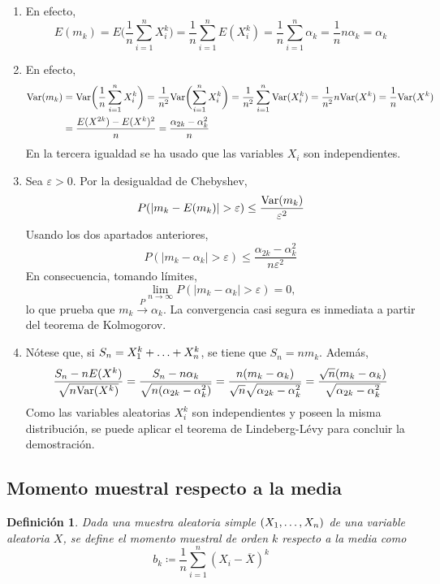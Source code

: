\documentclass[11pt]{report}
\makeatletter
\renewenvironment{proof}[1][\proofname]{\par
  \pushQED{\qed}%
  \normalfont \topsep\z@skip %
  \trivlist
  \item[\hskip\labelsep
        \itshape
    #1\@addpunct{.}]\ignorespaces
}{%
  \popQED\endtrivlist\@endpefalse
}
\newtheorem{definition}{Definición}
\theoremstyle{definition}
\makeatother
\begin{document}
\begin{proof}
\hfill
\begin{enumerate}
    \item En efecto,
    \[E(m_k) = E\biggl(\frac{1}{n}\sum_{i=1}^n X_i^k\biggr) = \frac{1}{n}\sum_{i=1}^n E(X_i^k) = \frac{1}{n}\sum_{i=1}^n \alpha_k = \frac{1}{n}n\alpha_k = \alpha_k\]
    \item En efecto,
    \[
    \begin{aligned}[t]
        \textup{Var}(m_k) &= \textup{Var}\biggl(\frac{1}{n}\sum_{i=1}^n X_i^k \biggr) = \frac{1}{n ^2} \textup{Var}\biggl(\sum_{i=1}^nX_i^k\biggr) = \frac{1}{n^2}\sum_{i=1}^n \textup{Var}(X_i^k)= \frac{1}{n^2}n \textup{Var}(X^k) = \frac{1}{n}\textup{Var}(X^k) \\
        &= \frac{E(X^{2k})-E(X^k)^2}{n} = \frac{\alpha_{2k}-\alpha_k^2}{n}
    \end{aligned}
    \]
    En la tercera igualdad se ha usado que las variables $X_i$ son independientes.
    \item Sea $\varepsilon>0$. Por la desigualdad de Chebyshev,
    \[P(|m_k-E(m_k)|>\varepsilon) \leq \frac{\textup{Var}(m_k)}{\varepsilon^2}\]
    Usando los dos apartados anteriores,
    \[P(|m_k-\alpha_k| > \varepsilon) \leq \frac{\alpha_{2k}-\alpha_k^2}{n\varepsilon^2}\]
    En consecuencia, tomando límites,
    \[\lim_{n \to \infty} P(|m_k-\alpha_k|> \varepsilon) = 0,\]
    lo que prueba que $m_k \xrightarrow{P} \alpha_k$. La convergencia casi segura es inmediata a partir del teorema de Kolmogorov.
    \item Nótese que, si $S_n = X_1^k+\mathellipsis+X_n^k$, se tiene que $S_n = nm_k$. Además,
    \[\frac{S_n-nE(X^k)}{\sqrt{n \textup{Var}(X^k)}} = \frac{S_n-n\alpha_k}{\sqrt{n(\alpha_{2k}-\alpha_k^2)}} = \frac{n(m_k-\alpha_k)}{\sqrt{n}\sqrt{\alpha_{2k}-\alpha_k^2}} = \frac{\sqrt{n}(m_k-\alpha_k)}{\sqrt{\alpha_{2k}-\alpha_k^2}}\]
    Como las variables aleatorias $X_i^k$ son independientes y poseen la misma distribución, se puede aplicar el teorema de Lindeberg-Lévy para concluir la demostración. \qedhere
\end{enumerate}
\end{proof}

\subsection{Momento muestral respecto a la media}

\begin{definition}
Dada una muestra aleatoria simple $(X_1,\mathellipsis,X_n)$ de una variable aleatoria $X$, se define el \emph{momento muestral de orden $k$ respecto a la media} como
\[b_k\coloneqq\frac{1}{n}\sum_{i=1}^n(X_i-\overline{X})^k\]
\end{definition}
\end{document}
